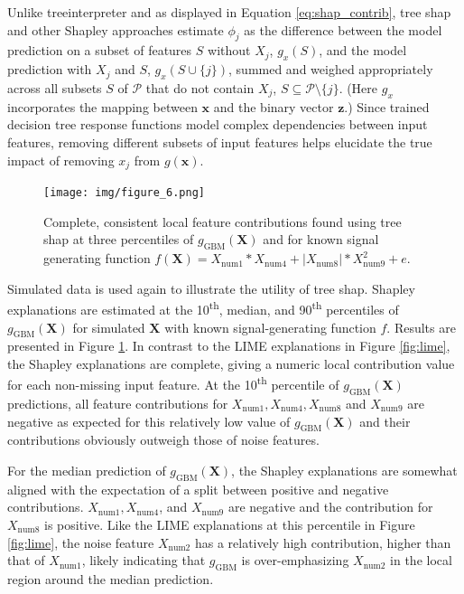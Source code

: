 \documentclass[sigconf, review]{acmart}
\begin{document}
\noindent Unlike treeinterpreter and as displayed in Equation \ref{eq:shap_contrib}, tree shap and other Shapley approaches estimate $\phi_j$ as the difference between the model prediction on a subset of features $S$ without $X_j$, $g_x(S)$, and the model prediction with $X_j$ and $S$, $g_x(S \cup \{j\})$, summed and weighed appropriately across all subsets $S$ of $\mathcal{P}$ that do not contain $X_j$, $S \subseteq \mathcal{P} \setminus \{j\}$. (Here $g_x$ incorporates the mapping between $\mathbf{x}$ and the binary vector $\mathbf{z}$.) Since trained decision tree response functions model complex dependencies between input features, removing different subsets of input features helps elucidate the true impact of removing $x_j$ from $g(\mathbf{x})$.

\begin{figure}[htb]
	\begin{center}
		\texttt{[image: img/figure\_6.png]}
		\caption{Complete, consistent local feature contributions found using tree shap at three percentiles of $g_{\text{GBM}}(\mathbf{X})$ and for known signal generating function $f(\mathbf{X}) = X_{\text{num}1} * X_{\text{num}4} + |X_{\text{num}8}| * X_{\text{num}9}^2 + e$.}
		\label{fig:shap}
	\end{center}
\end{figure}

Simulated data is used again to illustrate the utility of tree shap. Shapley explanations are estimated at the 10\textsuperscript{th}, median, and 90\textsuperscript{th} percentiles of $g_{\text{GBM}}(\mathbf{X})$ for simulated $\mathbf{X}$ with known signal-generating function $f$. Results are presented in Figure \ref{fig:shap}. In contrast to the LIME explanations in Figure \ref{fig:lime}, the Shapley explanations are complete, giving a numeric local contribution value for each non-missing input feature. At the 10\textsuperscript{th} percentile of $g_{\text{GBM}}(\mathbf{X})$ predictions, all feature contributions for $X_{\text{num}1}, X_{\text{num}4}, X_{\text{num}8}$ and $X_{\text{num}9}$ are negative as expected for this relatively low value of $g_{\text{GBM}}(\mathbf{X})$ and their contributions obviously outweigh those of noise features.

For the median prediction of $g_{\text{GBM}}(\mathbf{X})$, the Shapley explanations are somewhat aligned with the expectation of a split between positive and negative contributions. $X_{\text{num}1}, X_{\text{num}4}$, and $X_{\text{num}9}$ are negative and the contribution for $X_{\text{num}8}$ is positive. Like the LIME explanations at this percentile in Figure \ref{fig:lime}, the noise feature $X_{\text{num}2}$ has a relatively high contribution, higher than that of $X_{\text{num}1}$, likely indicating that $g_{\text{GBM}}$ is over-emphasizing $X_{\text{num}2}$ in the local region around the median prediction. 
\end{document}
